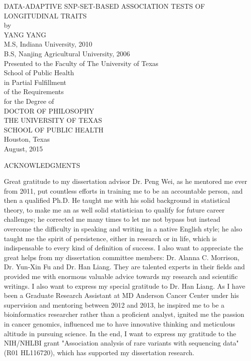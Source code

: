 \documentclass[12pt]{article}
\begin{document}
\newpage
\thispagestyle{empty}
\doublespacing
\begin{center}
{\normalsize DATA-ADAPTIVE SNP-SET-BASED ASSOCIATION TESTS OF LONGITUDINAL TRAITS }\\[3.2cm]

by\\[0.5cm]

YANG YANG\\
M.S, Indiana University, 2010\\
B.S, Nanjing Agricultural University, 2006\\[2cm]

Presented to the Faculty of The University of Texas\\
School of Public Health\\
in Partial Fulfillment\\
of the Requirements\\
for the Degree of\\[1.5cm]
DOCTOR OF PHILOSOPHY\\[1.5cm]
\singlespacing
THE UNIVERSITY OF TEXAS\\
SCHOOL OF PUBLIC HEALTH\\
Houston, Texas\\
August, 2015
\end{center}


\newpage
\thispagestyle{empty}
\doublespacing
\begin{center}
ACKNOWLEDGMENTS
\end{center}
Great gratitude to my dissertation advisor Dr. Peng Wei, as he mentored me ever from 2011, put countless efforts in training me to be an accountable person, and then a qualified Ph.D. He taught me with his solid background in statistical theory, to make me an as well solid statistician to qualify for future career challenges; he corrected me many times to let me not bypass but instead overcome the difficulty in speaking and writing in a native English style; he also taught me the spirit of persistence, either in research or in life, which is indispensable to every kind of definition of success. I also want to appreciate the great helps from my dissertation committee members: Dr. Alanna C. Morrison, Dr. Yun-Xin Fu and Dr. Han Liang. They are talented experts in their fields and provided me with enormous valuable advice towards my research and scientific writings. I also want to express my special gratitude to Dr. Han Liang. As I have been a Graduate Research Assistant at MD Anderson Cancer Center under his supervision and mentoring between 2012 and 2013, he inspired me to be a bioinformatics researcher rather than a proficient analyst, ignited me the passion in cancer genomics, influenced me to have innovative thinking and meticulous altitude in pursuing science. In the end, I want to express my gratitude to the NIH/NHLBI grant "Association analysis of rare variants with sequencing data" (R01 HL116720), which has supported my dissertation research.
\end{document}
